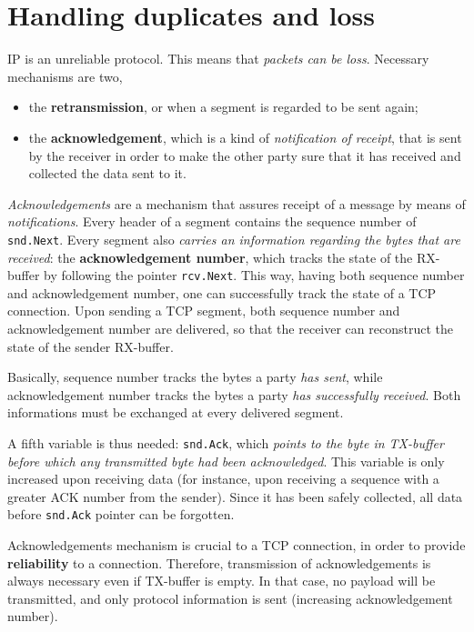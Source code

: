 \documentclass[10pt]{book}
\begin{document}
\section{Handling duplicates and loss}

IP is an unreliable protocol. This means that \emph{packets can be loss}.
Necessary mechanisms are two,

\begin{itemize}
    \item the \textbf{retransmission}, or when a segment is regarded to be
        sent again;
    \item the \textbf{acknowledgement}, which is a kind of \emph{notification
            of receipt}, that is sent by the receiver in order to make the
            other party sure that it has received and collected the data sent
            to it.
\end{itemize}

\emph{Acknowledgements} are a mechanism that assures receipt of a message by
means of \emph{notifications}. Every header of a segment contains the sequence
number of \texttt{snd.Next}. Every segment also \emph{carries an information
regarding the bytes that are received}: the \textbf{acknowledgement number},
which tracks the state of the RX-buffer by following the pointer
\texttt{rcv.Next}. This way, having both sequence number and acknowledgement
number, one can successfully track the state of a TCP connection. Upon sending
a TCP segment, both sequence number and acknowledgement number are delivered,
so that the receiver can reconstruct the state of the sender RX-buffer.

Basically, sequence number tracks the bytes a party \emph{has sent}, while
acknowledgement number tracks the bytes a party \emph{has successfully
received}. Both informations must be exchanged at every delivered segment.

A fifth variable is thus needed: \texttt{snd.Ack}, which \emph{points to the
byte in TX-buffer before which any transmitted byte had been acknowledged}.
This variable is only increased upon receiving data (for instance, upon
receiving a sequence with a greater ACK number from the sender). Since it has
been safely collected, all data before \texttt{snd.Ack} pointer can be
forgotten. 

Acknowledgements mechanism is crucial to a TCP connection, in order to
provide \textbf{reliability} to a connection. Therefore, transmission of
acknowledgements is always necessary even if TX-buffer is empty. In that case, no
payload will be transmitted, and only protocol information is sent (increasing
acknowledgement number).
\end{document}

